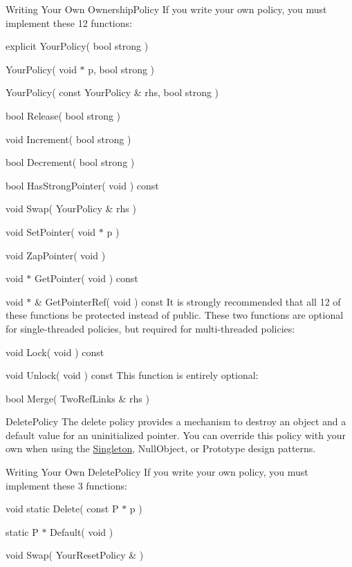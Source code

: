 \begin{DoxyParagraph}{Writing Your Own Ownership\+Policy}
If you write your own policy, you must implement these 12 functions\+:
\begin{DoxyEnumerate}
\item explicit Your\+Policy( bool strong )
\item Your\+Policy( void $\ast$ p, bool strong )
\item Your\+Policy( const Your\+Policy \& rhs, bool strong )
\item bool Release( bool strong )
\item void Increment( bool strong )
\item bool Decrement( bool strong )
\item bool Has\+Strong\+Pointer( void ) const
\item void Swap( Your\+Policy \& rhs )
\item void Set\+Pointer( void $\ast$ p )
\item void Zap\+Pointer( void )
\item void $\ast$ Get\+Pointer( void ) const
\item void $\ast$ \& Get\+Pointer\+Ref( void ) const It is strongly recommended that all 12 of these functions be protected instead of public. These two functions are optional for single-\/threaded policies, but required for multi-\/threaded policies\+:
\item void Lock( void ) const
\item void Unlock( void ) const This function is entirely optional\+:
\item bool Merge( Two\+Ref\+Links \& rhs )
\end{DoxyEnumerate}
\end{DoxyParagraph}
\begin{DoxyParagraph}{Delete\+Policy}
The delete policy provides a mechanism to destroy an object and a default value for an uninitialized pointer. You can override this policy with your own when using the \hyperlink{classSingleton}{Singleton}, Null\+Object, or Prototype design patterns.
\end{DoxyParagraph}
\begin{DoxyParagraph}{Writing Your Own Delete\+Policy}
If you write your own policy, you must implement these 3 functions\+:
\begin{DoxyEnumerate}
\item void static Delete( const P $\ast$ p )
\item static P $\ast$ Default( void )
\item void Swap( Your\+Reset\+Policy \& )
\end{DoxyEnumerate}
\end{DoxyParagraph}
